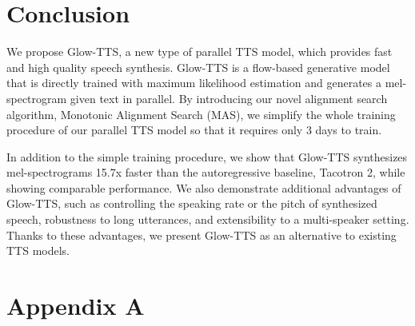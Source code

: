 \documentclass{article}
\begin{document}
\section{Conclusion}

We propose Glow-TTS, a new type of parallel TTS model, which provides fast and high quality speech synthesis. Glow-TTS is a flow-based generative model that is directly trained with maximum likelihood estimation and generates a mel-spectrogram given text in parallel. By introducing our novel alignment search algorithm, Monotonic Alignment Search (MAS), we simplify the whole training procedure of our parallel TTS model so that it requires only 3 days to train. 

In addition to the simple training procedure, we show that Glow-TTS synthesizes mel-spectrograms 15.7x faster than the autoregressive baseline, Tacotron 2, while showing comparable performance. We also demonstrate additional advantages of Glow-TTS, such as controlling the speaking rate or the pitch of synthesized speech, robustness to long utterances, and extensibility to a multi-speaker setting. Thanks to these advantages, we present Glow-TTS as an alternative to existing TTS models.


\nocite{langley00}




\onecolumn
















\section*{Appendix A}
\label{appa}
\end{document}
